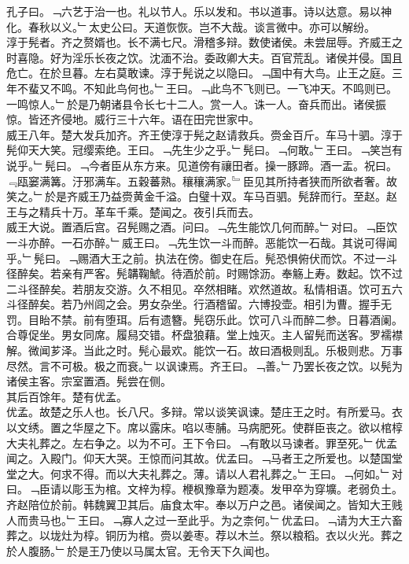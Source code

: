 \documentclass{zhvt-classic}
\begin{document}

\hspace*{2em}孔子曰。﹁六艺于治一也。礼以节人。乐以发和。书以道事。诗以达意。易以神化。春秋以义。﹂太史公曰。天道恢恢。岂不大哉。谈言微中。亦可以解纷。\\
\hspace*{2em}淳于髡者。齐之赘婿也。长不满七尺。滑稽多辩。数使诸侯。未尝屈辱。齐威王之时喜隐。好为淫乐长夜之饮。沈湎不治。委政卿大夫。百官荒乱。诸侯并侵。国且危亡。在於旦暮。左右莫敢谏。淳于髡说之以隐曰。﹁国中有大鸟。止王之庭。三年不蜚又不鸣。不知此鸟何也。﹂王曰。﹁此鸟不飞则已。一飞冲天。不鸣则已。一鸣惊人。﹂於是乃朝诸县令长七十二人。赏一人。诛一人。奋兵而出。诸侯振惊。皆还齐侵地。威行三十六年。语在田完世家中。\\
\hspace*{2em}威王八年。楚大发兵加齐。齐王使淳于髡之赵请救兵。赍金百斤。车马十驷。淳于髡仰天大笑。冠缨索绝。王曰。﹁先生少之乎。﹂髡曰。﹁何敢。﹂王曰。﹁笑岂有说乎。﹂髡曰。﹁今者臣从东方来。见道傍有禳田者。操一豚蹄。酒一盂。祝曰。﹃瓯窭满篝。汙邪满车。五穀蕃熟。穰穰满家。﹄臣见其所持者狭而所欲者奢。故笑之。﹂於是齐威王乃益赍黄金千溢。白璧十双。车马百驷。髡辞而行。至赵。赵王与之精兵十万。革车千乘。楚闻之。夜引兵而去。\\
\hspace*{2em}威王大说。置酒后宫。召髡赐之酒。问曰。﹁先生能饮几何而醉。﹂对曰。﹁臣饮一斗亦醉。一石亦醉。﹂威王曰。﹁先生饮一斗而醉。恶能饮一石哉。其说可得闻乎。﹂髡曰。﹁赐酒大王之前。执法在傍。御史在后。髡恐惧俯伏而饮。不过一斗径醉矣。若亲有严客。髡韝鞠鯱。待酒於前。时赐馀沥。奉觞上寿。数起。饮不过二斗径醉矣。若朋友交游。久不相见。卒然相睹。欢然道故。私情相语。饮可五六斗径醉矣。若乃州闾之会。男女杂坐。行酒稽留。六博投壶。相引为曹。握手无罚。目眙不禁。前有堕珥。后有遗簪。髡窃乐此。饮可八斗而醉二参。日暮酒阑。合尊促坐。男女同席。履舄交错。杯盘狼藉。堂上烛灭。主人留髡而送客。罗襦襟解。微闻芗泽。当此之时。髡心最欢。能饮一石。故曰酒极则乱。乐极则悲。万事尽然。言不可极。极之而衰。﹂以讽谏焉。齐王曰。﹁善。﹂乃罢长夜之饮。以髡为诸侯主客。宗室置酒。髡尝在侧。\\
\hspace*{2em}其后百馀年。楚有优孟。\\
\hspace*{2em}优孟。故楚之乐人也。长八尺。多辩。常以谈笑讽谏。楚庄王之时。有所爱马。衣以文绣。置之华屋之下。席以露床。啗以枣脯。马病肥死。使群臣丧之。欲以棺椁大夫礼葬之。左右争之。以为不可。王下令曰。﹁有敢以马谏者。罪至死。﹂优孟闻之。入殿门。仰天大哭。王惊而问其故。优孟曰。﹁马者王之所爱也。以楚国堂堂之大。何求不得。而以大夫礼葬之。薄。请以人君礼葬之。﹂王曰。﹁何如。﹂对曰。﹁臣请以彫玉为棺。文梓为椁。楩枫豫章为题凑。发甲卒为穿壙。老弱负土。齐赵陪位於前。韩魏翼卫其后。庙食太牢。奉以万户之邑。诸侯闻之。皆知大王贱人而贵马也。﹂王曰。﹁寡人之过一至此乎。为之柰何。﹂优孟曰。﹁请为大王六畜葬之。以垅灶为椁。铜历为棺。赍以姜枣。荐以木兰。祭以粮稻。衣以火光。葬之於人腹肠。﹂於是王乃使以马属太官。无令天下久闻也。\\
\end{document}
